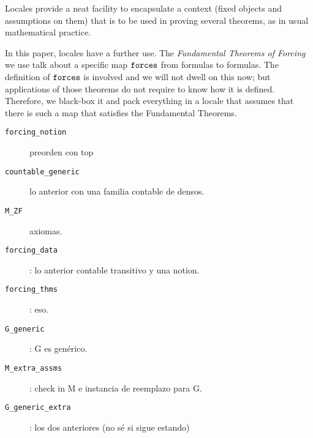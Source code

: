 Locales \cite{ballarin2010tutorial} provide a neat facility to
encapsulate a context (fixed objects and assumptions on them) that is
to be used in proving several theorems, as in usual mathematical
practice. 

In this paper, locales have a further use. The \emph{Fundamental
  Theorems of Forcing} we use talk about a specific map $\mathop{\mathtt{forces}}$
from formulas to formulas. The definition of $\mathop{\mathtt{forces}}$ is involved
and we will not dwell on this now; but applications of those theorems
do not require to know how it is defined. Therefore, we black-box it
and pack everything in a locale that assumes that there is such a
map that satisfies the Fundamental Theorems.

\begin{description}
\item[\texttt{forcing\_notion}] preorden con top
\item[\texttt{countable\_generic}] lo anterior con una familia contable de densos.
\item[\texttt{M\_ZF}] axiomas.
\item[\texttt{forcing\_data}]: lo anterior contable transitivo y una notion.
\item[\texttt{forcing\_thms}]: eso.
\item[\texttt{G\_generic}]: G es genérico.
\item[\texttt{M\_extra\_assms}]: check in M e instancia de reemplazo para G.
\item[\texttt{G\_generic\_extra}]: los dos anteriores (no sé si sigue estando)
\end{description}



